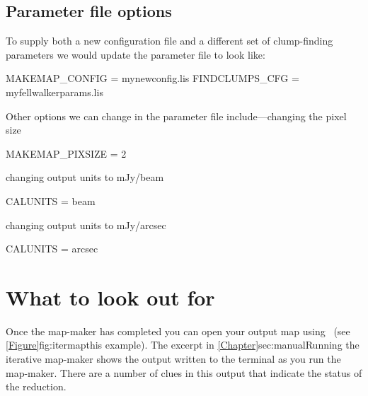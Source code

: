 \subsection{Parameter file options}

To supply both a new configuration file and a different set of
clump-finding parameters we would update the parameter file
 to look like:

\begin{terminalv}
MAKEMAP_CONFIG = mynewconfig.lis
FINDCLUMPS_CFG = myfellwalkerparams.lis
\end{terminalv}

Other options we can change in the parameter file include---changing the pixel size

\begin{terminalv}
MAKEMAP_PIXSIZE = 2
\end{terminalv}

changing output units to mJy/beam

\begin{terminalv}
CALUNITS = beam
\end{terminalv}

changing output units to mJy/arcsec

\begin{terminalv}
CALUNITS = arcsec
\end{terminalv}



\section{What to look out for}
\flushbottom

Once the map-maker has completed you can open your output map using
\gaia\ (see \cref{Figure}{fig:itermap}{this example}). The excerpt in
\cref{Chapter}{sec:manual}{Running the iterative map-maker} shows the
output written to the terminal as you run the map-maker. There are a
number of clues in this output that indicate the status of the
reduction.


